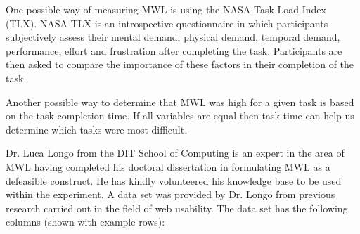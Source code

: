 One possible way of measuring MWL is using the NASA-Task Load Index (TLX). NASA-TLX is an introspective questionnaire in which participants subjectively assess their mental demand, physical demand, temporal demand, performance, effort and frustration after completing the task. Participants are then asked to compare the importance of these factors in their completion of the task. 

Another possible way to determine that MWL was high for a given task is based on the task completion time. If all variables are equal then task time can help us determine which tasks were most difficult.

Dr. Luca Longo from the DIT School of Computing is an expert in the area of MWL having completed his doctoral dissertation in formulating MWL as a defeasible construct. He has kindly volunteered his knowledge base to be used within the experiment. A data set was provided by Dr. Longo from previous research carried out in the field of web usability. The data set has the following columns (shown with example rows):


